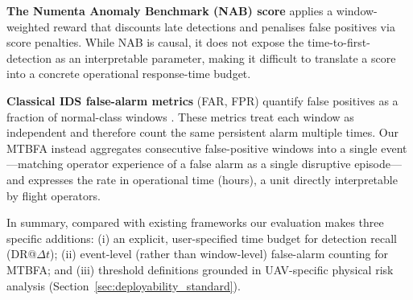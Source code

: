 \textbf{The Numenta Anomaly Benchmark (NAB) score} \cite{lavin2015evaluating}
applies a window-weighted reward that discounts late detections and penalises
false positives via score penalties. While NAB is causal, it does not expose
the time-to-first-detection as an interpretable parameter, making it difficult
to translate a score into a concrete operational response-time budget.

\textbf{Classical IDS false-alarm metrics} (FAR, FPR) quantify false positives
as a fraction of normal-class windows \cite{axelsson2000base}. These metrics
treat each window as independent and therefore count the same persistent alarm
multiple times. Our MTBFA instead aggregates consecutive false-positive windows
into a single event—matching operator experience of a false alarm as a single
disruptive episode—and expresses the rate in operational time (hours), a unit
directly interpretable by flight operators.

In summary, compared with existing frameworks our evaluation makes
three specific additions: (i) an explicit, user-specified time budget for
detection recall (DR@$\Delta t$); (ii) event-level (rather than window-level)
false-alarm counting for MTBFA; and (iii) threshold definitions grounded in
UAV-specific physical risk analysis (Section~\ref{sec:deployability_standard}).
